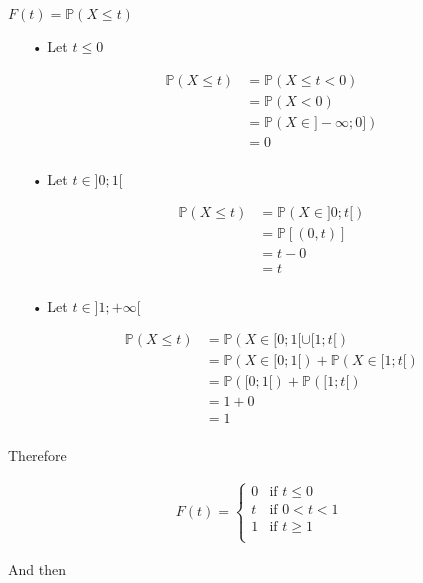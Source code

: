 \documentclass[11pt]{article}
\def\lt{<}
\begin{document}
    $F(t)=\mathbb{P}(X\le t)$
    \begin{itemize}
    \item[•] Let $t\le 0$
    
    \begin{align*}
\mathbb{P}(X\le t) &=\mathbb{P}(X\le t \lt 0)\\
       &=\mathbb{P}(X\lt 0)\\
       &=\mathbb{P}(X\in ]-\infty ;0])\\
       &=0\\
\end{align*}

\item[•] Let $t\in ]0;1[$
    
    \begin{align*}
\mathbb{P}(X\le t)
       &=\mathbb{P}(X\in ]0 ;t[)\\
       &=\mathbb{P}[(0 ,t)]\\
       &=t-0\\
       &=t\\
\end{align*}

\item[•] Let $t\in ]1; +\infty[$ 
    
    \begin{align*}
\mathbb{P}(X\le t)
       &=\mathbb{P}(X\in [0 ;1[\cup [1;t[)\\
       &=\mathbb{P}(X\in [0 ;1[)+\mathbb{P}(X\in [1;t[)\\
       &=\mathbb{P}([0 ;1[)+\mathbb{P}([1;t[)\\
       &=1+0\\
       &=1\\
\end{align*} 

    \end{itemize}
    
    
  Therefore
  
  \begin{align*}
F(t) = \begin{cases}
            0 & \text{if } t \le 0\\
            t & \text{if } 0 \lt t \lt 1\\
            1 & \text{if } t \geq 1\\
        \end{cases}
\end{align*}
    
And then 
\end{document}
